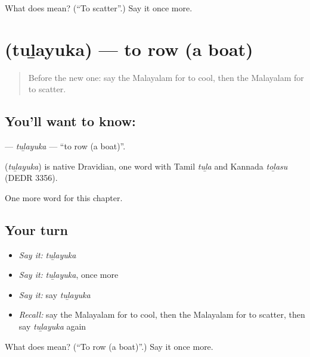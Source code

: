 \begin{tcolorbox}[breakable,colback=teal!4,colframe=teal!35!black,title={Before you move on}]
What does  mean? (\textquotedblleft{}To scatter\textquotedblright{}.) Say it once more.
\end{tcolorbox}
\section[\texorpdfstring{\ml{തുഴയുക} (tuḻayuka)}{തുഴയുക (tuḻayuka)}]{ (tuḻayuka) — to row (a boat)}

\label{lesson:ML-C191-tulayuka}



\begin{quote}
Before the new one: say the Malayalam for to cool, then the Malayalam for to scatter.
\end{quote}

\subsection*{You'll want to know: }
\textbf{} — \emph{tuḻayuka} — \textquotedblleft{}to row (a boat)\textquotedblright{}.

\begin{cousinweb}
\textbf{} (\emph{tuḻayuka}) is native Dravidian, one word with Tamil \emph{tuḻa} and Kannada \emph{toḻasu} (DEDR 3356).
\end{cousinweb}

\begin{grammarlens}[title={What you've built}]
One more word for this chapter.
\end{grammarlens}

\subsection*{Your turn}
\begin{itemize}
\raggedright
  \item \emph{Say it:} \emph{tuḻayuka}
  \item \emph{Say it:} \emph{tuḻayuka}, once more
  \item \emph{Say it:} say \emph{tuḻayuka}
  \item \emph{Recall:} say the Malayalam for to cool, then the Malayalam for to scatter, then say \emph{tuḻayuka} again
\end{itemize}

\begin{tcolorbox}[breakable,colback=teal!4,colframe=teal!35!black,title={Before you move on}]
What does  mean? (\textquotedblleft{}To row (a boat)\textquotedblright{}.) Say it once more.
\end{tcolorbox}
